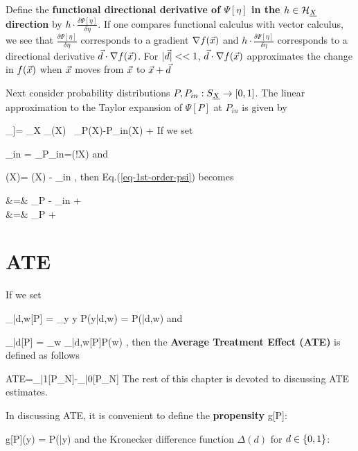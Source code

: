 Define the
{\bf functional directional derivative of $\Psi[\eta]$ in
the $h\in {\cal H}_{\underline{X}}$
direction}
by $h\cdot\frac{\delta \Psi[\eta]}{\delta \eta}$.
If one compares functional calculus with vector calculus, we see that
$\frac{\delta \Psi[\eta]}{\delta \eta}$ corresponds to a gradient
$\nabla f({\vec{x}})$ and
$h\cdot \frac{\delta \Psi[\eta]}{\delta \eta}$
corresponds to a directional derivative
${\vec{d}}\cdot \nabla f({\vec{x}})$.
For $|{\vec{d}}|<<1$, ${\vec{d}}\cdot \nabla f({\vec{x}})$ approximates
the change
in $f({\vec{x}})$ when ${\vec{x}}$ moves from ${\vec{x}}$ to ${\vec{x}}+{\vec{d}}$

Next consider probability
distributions $P, P_{in}:S_{\underline{X}}\rightarrow [0,1]$.
The linear approximation
to the Taylor expansion of $\Psi[P]$ at
$P_{in}$ is given by

\beq
\underbrace{\Psi[P] - \Psi[P_{in}]}_{\delta \Psi[P,P_{in}]}]=
\sum_X
_{\dpsi[P_{in}](X)}
\
_{P(X)-P_{in}(X)}
+
\calr[P, P_{in}]
\label{eq-1st-order-psi}
\eeq
If we set

\beq
\dpsi_{in} = \av{\dpsi[P_{in}]}_{P_{in}}=\caln(!X)\in\RR
\eeq
and

\beq
\delta\dpsi[P](X)= \dpsi[P](X) - \dpsi_{in}
\;,
\eeq
then Eq.(\ref{eq-1st-order-psi}) becomes

\beqa
\delta\Psi[P,P_{in}]&=&
\av{\dpsi[P_{in}]}_P - \dpsi_{in}
+
\calr[P, P_{in}]
\\
&=&
\av{\delta\dpsi[P_{in}]}_P
+
\calr[P, P_{in}]
\eeqa





\section{ATE}

If we set

\beq
\caly_{|d,w}[P] = \sum_y y P(y|d,w) = P(|d,w)
\eeq
and

\beq
\caly_{|d}[P] = \sum_w \caly_{|d,w}[P]P(w)
\;,
\eeq
then the {\bf Average Treatment Effect (ATE)}
is defined as follows

\beq
ATE=\caly_{|1}[P_N]-\caly_{|0}[P_N]
\eeq
The rest of this
chapter is devoted
to discussing ATE estimates.

In discussing ATE,
it is convenient to define the
{\bf propensity} g[P]:

\beq
g[P](y) = P(|y)
\eeq
and the
Kronecker difference function $\Delta(d)$
for $d\in \{0,1\}$:

